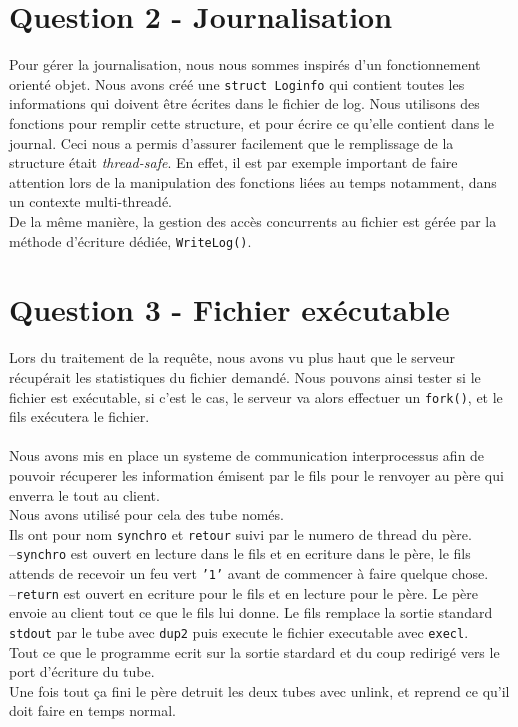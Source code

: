 \documentclass[final,12pt]{article}
\begin{document}
\section*{\textbf{Question 2} - Journalisation {\color{green}\checkmark}}
	Pour gérer la journalisation, nous nous sommes inspirés d'un fonctionnement orienté objet.
	Nous avons créé une \texttt{struct Loginfo} qui contient toutes les informations qui doivent être écrites dans le fichier de log. Nous utilisons des fonctions pour remplir cette structure, et pour écrire ce qu'elle contient dans le journal. Ceci nous a permis d'assurer facilement que le remplissage de la structure était \textit{thread-safe}. En effet, il est par exemple important de faire attention lors de la manipulation des fonctions liées au temps notamment, dans un contexte multi-threadé.\\
	De la même manière, la gestion des accès concurrents au fichier est gérée par la méthode d'écriture dédiée, \texttt{WriteLog()}.

\section*{\textbf{Question 3} - Fichier exécutable {\color{green}\checkmark}}
Lors du traitement de la requête, nous avons vu plus haut que
le serveur récupérait les statistiques du fichier
demandé. Nous pouvons ainsi tester si le fichier est
exécutable, si c'est le cas, le serveur va alors effectuer un
\texttt{fork()}, et le fils exécutera le fichier.\\\\
Nous avons mis en place un systeme de communication interprocessus
afin de pouvoir récuperer les information émisent par le fils pour le
renvoyer au p\`ere qui enverra le tout au client.\\
Nous avons utilisé pour cela des tube només.\\
Ils ont pour nom \texttt{synchro} et \texttt{retour} suivi par le
numero de thread du p\`ere.\\   
--\texttt{synchro} est ouvert en lecture dans le fils et en ecriture
dans le p\`ere, le fils attends de recevoir un feu vert \texttt{'1'}
avant de commencer à faire quelque chose.\\
--\texttt{return} est ouvert en ecriture pour le fils et en lecture pour
le p\`ere. Le p\`ere envoie au client tout ce que le fils lui
donne. Le fils remplace la sortie standard \texttt{stdout} par le tube
avec \texttt{dup2} puis execute le fichier executable avec \texttt{execl}.\\
Tout ce que le programme ecrit sur la sortie stardard et du coup
redirigé vers le port d'\'ecriture du tube.\\
Une fois tout \c ca fini le p\`ere detruit les deux tubes avec unlink,
et reprend ce qu'il doit faire en temps normal.\\\\
\end{document}
